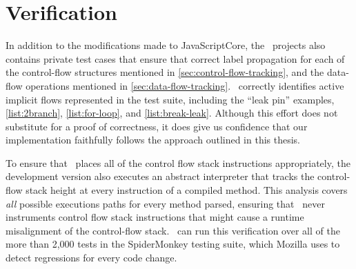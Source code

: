 \section{Verification}

In addition to the modifications made to JavaScriptCore, the \FlowCore\ projects also contains private test cases that ensure that correct label propagation for each of the control-flow structures mentioned in \autoref{sec:control-flow-tracking}, and the data-flow operations mentioned in \autoref{sec:data-flow-tracking}.
\FlowCore\ correctly identifies active implicit flows represented in the test suite, including the ``leak pin'' examples, \autoref{list:2branch}, \autoref{list:for-loop}, and \autoref{list:break-leak}.
Although this effort does not substitute for a proof of correctness, it does give us confidence that our implementation faithfully follows the approach outlined in this thesis.

To ensure that \FlowCore\ places all of the control flow stack instructions appropriately, the development version also executes an abstract interpreter that tracks the control-flow stack height at every instruction of a compiled method.
This analysis covers \emph{all} possible executions paths for every method parsed, ensuring that \FlowCore\ never instruments control flow stack instructions that might cause a runtime misalignment of the control-flow stack.
\FlowCore\ can run this verification over all of the more than 2,000 tests in the SpiderMonkey testing suite, which Mozilla uses to detect regressions for every code change.

